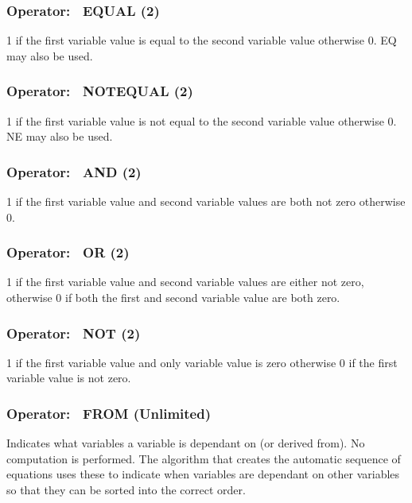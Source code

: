 \subsubsection{Operator:~ EQUAL (2)}\label{operator-equal-2}

1 if the first variable value is equal to the second variable value otherwise 0. EQ may also be used.

\subsubsection{Operator:~ NOTEQUAL (2)}\label{operator-notequal-2}

1 if the first variable value is not equal to the second variable value otherwise 0. NE may also be used.

\subsubsection{Operator:~ AND (2)}\label{operator-and-2}

1 if the first variable value and second variable values are both not zero otherwise 0.

\subsubsection{Operator:~ OR (2)}\label{operator-or-2}

1 if the first variable value and second variable values are either not zero, otherwise 0 if both the first and second variable value are both zero.

\subsubsection{Operator:~ NOT (2)}\label{operator-not-2}

1 if the first variable value and only variable value is zero otherwise 0 if the first variable value is not zero.

\subsubsection{Operator:~ FROM (Unlimited)}\label{operator-from-unlimited}

Indicates what variables a variable is dependant on (or derived from). No computation is performed. The algorithm that creates the automatic sequence of equations uses these to indicate when variables are dependant on other variables so that they can be sorted into the correct order.